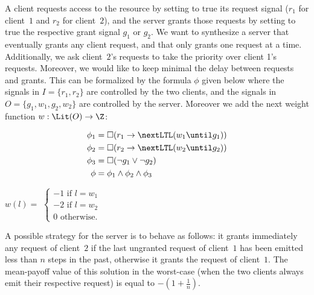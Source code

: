 \begin{example} \label{ex:ltl} 
A client requests access to the resource by setting to true its request signal ($r_1$ for client~$1$ and $r_2$ for client~$2$), and the server grants those requests by setting to true the respective grant signal $g_1$ or $g_2$. We want to synthesize a server that eventually grants any client request, and that only grants one request at a time. Additionally, we ask client~$2$'s requests to take the priority over client 1's requests.  Moreover, we would like to keep minimal the delay between requests and grants. This can be formalized by the \LTL formula $\phi$ given below where the signals in $I = \{r_1, r_2\}$ are controlled by the two clients, and the signals in $O = \{g_1,w_1, g_2,w_2 \}$ are controlled by the server. Moreover we add the next weight function $w : \Lit(O) \rightarrow \Z$:

\begin{minipage}{0.5\linewidth}
\begin{equation*} 
	\begin{split}
		\phi_1 &= \square(r_1 \rightarrow \nextLTL(w_1 \until g_1))\\
		\phi_2 &= \square(r_2 \rightarrow \nextLTL(w_2 \until g_2))\\
		\phi_3 &= \square(\lnot g_1 \vee \lnot g_2)\\
		\phi &= \phi_1 \wedge \phi_2 \wedge \phi_3
	\end{split} 
\end{equation*}
\end{minipage}
\begin{minipage}{0.4\linewidth}
\begin{center}
$w(l) =$
$\begin{cases} -1 \text{ if } l = w_1\\ -2 \text{ if } l = w_2\\ 0 \text{ otherwise.} \end{cases}$
\end{center}
\end{minipage}

\medskip\noindent
A possible strategy for the server is to behave as follows: it grants immediately any request of client~$2$ if the last ungranted request of client~$1$ has been emitted less than $n$ steps in the past, otherwise it grants the request of client~$1$. The mean-payoff value of this solution in the worst-case (when the two clients always emit their respective request) is equal to $-(1 + \frac{1}{n})$.
\end{example}

